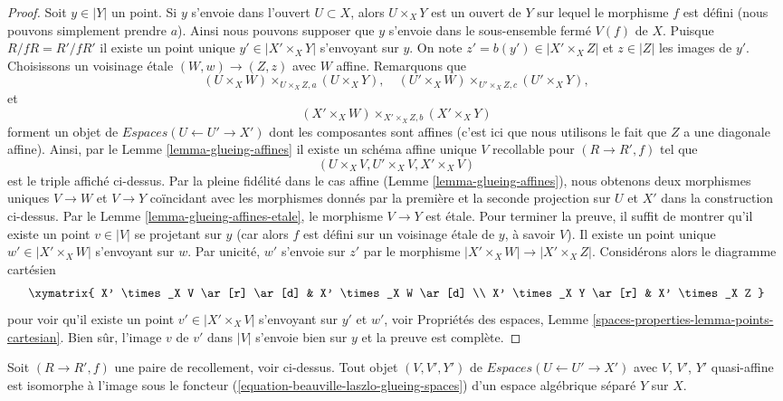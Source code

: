 \begin{proof}
\medskip\noindent
Soit $y \in |Y|$ un point. Si $y$ s'envoie dans l'ouvert $U \subset X$,
alors $U \times_X Y$ est un ouvert de $Y$ sur lequel le morphisme $f$
est défini (nous pouvons simplement prendre $a$).
Ainsi nous pouvons supposer que $y$ s'envoie dans le sous-ensemble fermé
$V(f)$ de $X$. Puisque $R/fR = R'/fR'$ il existe un point unique
$y' \in |X' \times_X Y|$ s'envoyant sur $y$. On note
$z' = b(y') \in |X' \times_X Z|$ et $z \in |Z|$ les images de $y'$.
Choisissons un voisinage \'etale $(W, w) \to (Z, z)$
avec $W$ affine. Remarquons que
$$
(U \times_X W) \times_{U \times_X Z, a} (U \times_X Y),\quad
(U' \times_X W) \times_{U' \times_X Z, c} (U' \times_X Y),
$$
et
$$
(X' \times_X W) \times_{X' \times_X Z, b} (X' \times_X Y)
$$
forment un objet de $\textit{Espaces}(U \leftarrow U' \to X')$
dont les composantes sont affines (c'est ici que nous utilisons le fait que $Z$ a une diagonale affine).
Ainsi, par le Lemme \ref{lemma-glueing-affines}
il existe un schéma affine unique $V$ recollable pour $(R \to R', f)$ tel que
$$
(U \times_X V, U' \times_X V, X' \times_X V)
$$
est le triple affiché ci-dessus. Par la pleine fidélité dans le cas affine (Lemme \ref{lemma-glueing-affines}), nous obtenons deux morphismes uniques $V \to W$ et $V \to Y$ coïncidant avec les morphismes donnés par la première et la seconde projection sur $U$ et $X'$ dans la construction ci-dessus. Par le Lemme \ref{lemma-glueing-affines-etale}, le morphisme $V \to Y$ est \'etale. Pour terminer la preuve, il suffit de montrer qu'il existe un point $v \in |V|$ se projetant sur $y$ (car alors $f$ est défini sur un voisinage \'etale de $y$, à savoir $V$). Il existe un point unique $w' \in |X' \times_X W|$ s'envoyant sur $w$. Par unicité, $w'$ s'envoie sur $z'$ par le morphisme $|X' \times_X W| \to |X' \times_X Z|$. Considérons alors le diagramme cartésien $$
\xymatrix{
X' \times_X V \ar[r] \ar[d] & X' \times_X W \ar[d] \\
X' \times_X Y \ar[r] & X' \times_X Z
}
$$
pour voir qu'il existe un point $v' \in |X' \times_X V|$ s'envoyant sur $y'$ et $w'$, voir Propriétés des espaces, Lemme \ref{spaces-properties-lemma-points-cartesian}. Bien sûr, l'image $v$ de $v'$ dans $|V|$ s'envoie bien sur $y$ et la preuve est complète. 
\end{proof}

\begin{lemma}
\label{lemma-glueing-quasi-affines}
Soit $(R \to R', f)$ une paire de recollement, voir ci-dessus. Tout objet
$(V, V', Y')$ de $\textit{Espaces}(U \leftarrow U' \to X')$
avec $V$, $V'$, $Y'$ quasi-affine est isomorphe à
l'image sous le foncteur (\ref{equation-beauville-laszlo-glueing-spaces})
d'un espace algébrique séparé $Y$ sur $X$.
\end{lemma}

